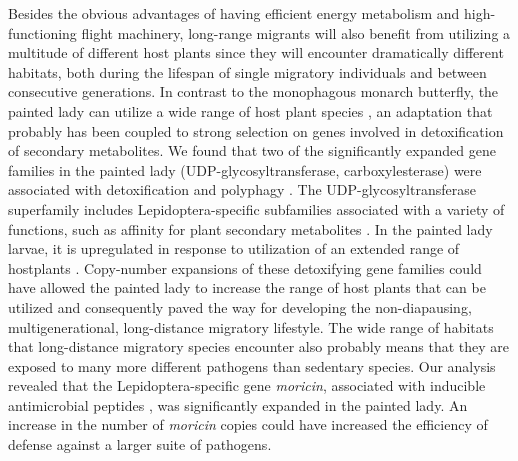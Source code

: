 \documentclass[twocolumn]{bmcart}%
\begin{document}
Besides the obvious advantages of having efficient energy metabolism and high-functioning flight machinery, long-range migrants will also benefit from utilizing a multitude of different host plants since they will encounter dramatically different habitats, both during the lifespan of single migratory individuals and between consecutive generations. In contrast to the monophagous monarch butterfly, the painted lady can utilize a wide range of host plant species \cite{nylinHOSTPLANTUTILIZATION2014,ackery_hostplants_1988}, an adaptation that probably has been coupled to strong selection on genes involved in detoxification of secondary metabolites. We found that two of the significantly expanded gene families in the painted lady (UDP-glycosyltransferase, carboxylesterase) were associated with detoxification and polyphagy \cite{breeschotenExpandingMenuAre2022, hatfieldCarboxylesterasesGeneralDetoxifying2016, nagareGlycosyltransferasesMultifacetedEnzymatic2021}. The UDP-glycosyltransferase superfamily includes Lepidoptera-specific subfamilies associated with a variety of functions, such as affinity for plant secondary metabolites \cite{huangUDPglucosyltransferaseMultigeneFamily2008, luqueCharacterizationNovelSilkworm2002}. In the painted lady larvae, it is upregulated in response to utilization of an extended range of hostplants \cite{celorio-manceraEvolutionaryHistoryHost2016}. Copy-number expansions of these detoxifying gene families could have allowed the painted lady to increase the range of host plants that can be utilized and consequently paved the way for developing the non-diapausing, multigenerational, long-distance migratory lifestyle. The wide range of habitats that long-distance migratory species encounter also probably means that they are exposed to many more different pathogens than sedentary species. Our analysis revealed that the Lepidoptera-specific gene \textit{moricin}, associated with inducible antimicrobial peptides \cite{haraMoricinNovelType1995}, was significantly expanded in the painted lady. An increase in the number of \textit{moricin} copies could have increased the efficiency of defense against a larger suite of pathogens.
\end{document}
